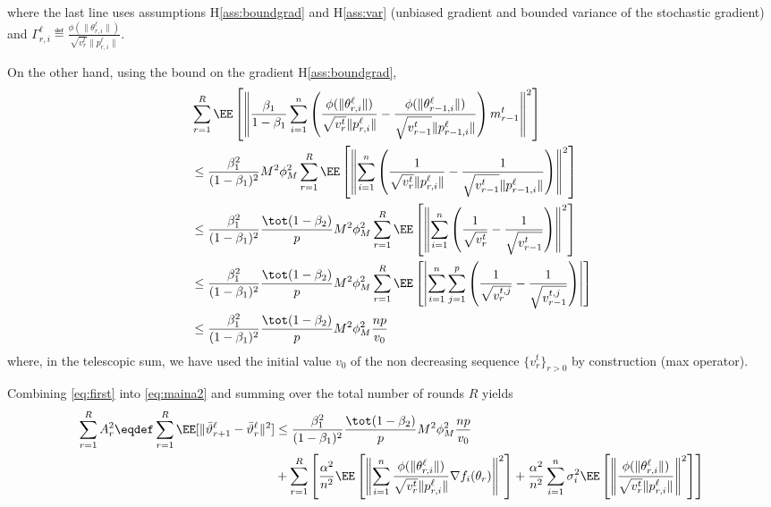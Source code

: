 \documentclass{article}
\begin{document}
where the last line uses assumptions H\ref{ass:boundgrad} and H\ref{ass:var} (unbiased gradient and bounded variance of the stochastic gradient) and $\Gamma_{r,i}^\ell \eqdef  \frac{\phi(\|\theta_{r,i}^{\ell}\|)}{\sqrt{v^{t}_{r}} \|p_{r,i}^{\ell}\|} $.

On the other hand, using the bound on the gradient H\ref{ass:boundgrad},
\begin{align}\label{eq:first}
\begin{split}
& \sum_{r=1}^R \EE \left[ \left\| \frac{ \beta_1}{1-\beta_1}  \sum_{i = 1}^n  \left( \frac{\phi(\|\theta_{r,i}^{\ell}\|)}{\sqrt{v^{t}_{r}} \|p_{r,i}^{\ell}\|} - \frac{\phi(\|\theta_{r-1,i}^{\ell}\|)}{\sqrt{v^{t}_{r-1}} \|p_{r-1,i}^{\ell}\|} \right) m^{t}_{r-1}\right\|^2 \right]  \\
& \leq   \frac{ \beta_1^2}{(1-\beta_1)^2} M^2 \phi^2_M \sum_{r=1}^R  \EE \left[  \left\| \sum_{i = 1}^n  \left( \frac{1}{\sqrt{v^{t}_{r}} \|p_{r,i}^{\ell}\|} - \frac{1}{\sqrt{v^{t}_{r-1}} \|p_{r-1,i}^{\ell}\|} \right) \right\|^2 \right]\\
& \leq   \frac{ \beta_1^2}{(1-\beta_1)^2} \frac{\tot(1-\beta_2)}{ p}  M^2 \phi^2_M \sum_{r=1}^R  \EE \left[  \left\| \sum_{i = 1}^n  \left( \frac{1}{\sqrt{v^{t}_{r}}} - \frac{1}{\sqrt{v^{t}_{r-1}}} \right) \right\|^2 \right]\\
& \leq   \frac{ \beta_1^2}{(1-\beta_1)^2} \frac{\tot(1-\beta_2)}{ p}  M^2 \phi^2_M \sum_{r=1}^R  \EE \left[  \left| \sum_{i = 1}^n  \sum_{j= 1}^p  \left( \frac{1}{\sqrt{v^{t,j}_{r}}} - \frac{1}{\sqrt{v^{t,j}_{r-1}}} \right) \right| \right]\\
& \leq   \frac{ \beta_1^2}{(1-\beta_1)^2} \frac{\tot(1-\beta_2)}{ p}  M^2 \phi^2_M \frac{n p}{v_0}
\end{split}
\end{align}
where, in the telescopic sum, we have used the initial value $v_0$ of the non decreasing sequence $\{v^t_r\}_{r >0}$ by construction (max operator).
 
Combining \eqref{eq:first} into \eqref{eq:maina2} and summing over the total number of rounds $R$ yields
\begin{align}\label{eq:finala2}
\begin{split}
\sum_{r=1}^R A_r^2 \eqdef \sum_{r=1}^R \EE[  \| \bar{\vartheta}^\ell_{r+1} - \bar{\vartheta}^\ell_r \|^2] & \leq \frac{ \beta_1^2}{(1-\beta_1)^2} \frac{\tot(1-\beta_2)}{ p}  M^2 \phi^2_M \frac{n p}{v_0} \\
& + \sum_{r=1}^R  \left[  \frac{\alpha^2}{n^2} \EE\left[ \left\| \sum_{i = 1}^n \frac{\phi(\|\theta_{r,i}^{\ell}\|)}{\sqrt{v^{t}_{r}} \|p_{r,i}^{\ell}\|}\nabla f_i(\theta_r) \right\|^2 \right] +  \frac{\alpha^2}{n^2} \sum_{i = 1}^n  \sigma_i^2 \EE\left[ \left\|\frac{\phi(\|\theta_{r,i}^{\ell}\|)}{\sqrt{v^{t}_{r}} \|p_{r,i}^{\ell}\|} \right\|^2 \right]\right]
\end{split}
\end{align}
\end{document}
